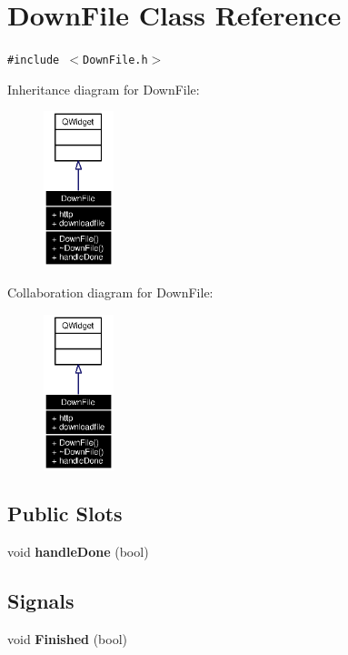 \section{Down\-File Class Reference}
\label{classDownFile}
{\tt \#include $<$Down\-File.h$>$}

Inheritance diagram for Down\-File:\begin{figure}[H]
\begin{center}
\leavevmode
\includegraphics[width=58pt]{classDownFile__inherit__graph}
\end{center}
\end{figure}
Collaboration diagram for Down\-File:\begin{figure}[H]
\begin{center}
\leavevmode
\includegraphics[width=58pt]{classDownFile__coll__graph}
\end{center}
\end{figure}
\subsection*{Public Slots}
\begin{CompactItemize}
\item 
void {\bf handle\-Done} (bool)
\end{CompactItemize}
\subsection*{Signals}
\begin{CompactItemize}
\item 
void {\bf Finished} (bool)
\end{CompactItemize}
